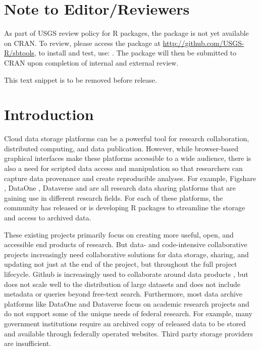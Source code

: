 
\section{Note to Editor/Reviewers}

As part of USGS review policy for R packages, the  package is not 
yet available on CRAN. To review, please access the package at 
\url{http://github.com/USGS-R/sbtools}, to install and test, use: 
. The  package will 
then be submitted to CRAN upon completion of internal and external review. 

This text snippet is to be removed before release.

\section{Introduction}

Cloud data storage platforms can be a powerful tool for research collaboration,
distributed computing, and data publication. However, while browser-based graphical
interfaces make these platforms accessible to a wide audience, there is also
a need for scripted data access and manipulation so that researchers can capture 
data provenance and create reproducible analyses. For example,
Figshare \citep{figshare}, DataOne \citep{dataone}, Dataverse \citep{dataverse} 
and \citep{ckan} are all research data
sharing platforms that are gaining use in different research fields. For each of these
platforms, the community has released \citep{rfigshare, dvn, ckanr} or is
developing \citep{dataonepkg} R packages to streamline the storage and access
to archived data. 

These existing projects primarily focus on creating more useful, open, and
accessible end products of research. But data- and code-intensive collaborative projects
increasingly need collaborative solutions for data storage, sharing, and updating
not just at the end of the project, but throughout the full project lifecycle. 
Github is increasingly used to collaborate around data products \citep{GandrudGithub}, 
but does not scale well to the distribution of large datasets \citep{Delcambre2013} and does not
include metadata or queries beyond free-text search. Furthermore, 
most data archive platforms like DataOne and Dataverse 
focus on academic research projects and do not support some
of the unique needs of federal research. For example, many government institutions
require an archived copy of released data to be stored and available through federally
operated websites. Third party storage providers are insufficient.

